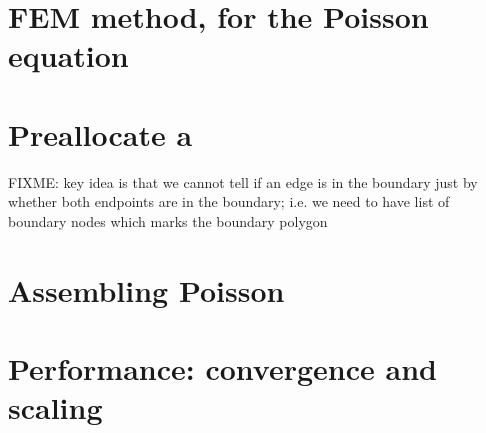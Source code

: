 \section{FEM method, for the Poisson equation}

\section{Preallocate a \pMat}

FIXME: key idea is that we cannot tell if an edge is in the boundary just by whether both endpoints are in the boundary; i.e. we need to have list of boundary nodes which marks the boundary polygon


\section{Assembling Poisson}

\section{Performance: convergence and scaling}

